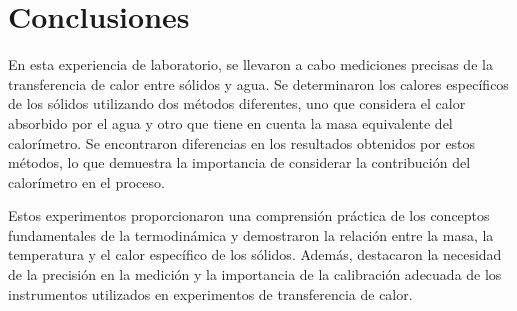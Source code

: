 \documentclass[letterpaper, 12pt]{article}
\begin{document}
\section{Conclusiones}

En esta experiencia de laboratorio, se llevaron a cabo
mediciones precisas de la transferencia de calor entre
sólidos y agua. Se determinaron los calores específicos de
los sólidos utilizando dos métodos diferentes, uno que
considera el calor absorbido por el agua y otro que tiene
en cuenta la masa equivalente del calorímetro. Se
encontraron diferencias en los resultados obtenidos por
estos métodos, lo que demuestra la importancia de
considerar la contribución del calorímetro en el proceso.

Estos experimentos proporcionaron una comprensión práctica
de los conceptos fundamentales de la termodinámica y
demostraron la relación entre la masa, la temperatura y el
calor específico de los sólidos. Además, destacaron la
necesidad de la precisión en la medición y la importancia
de la calibración adecuada de los instrumentos utilizados
en experimentos de transferencia de calor.

\printbibliography
\end{document}
